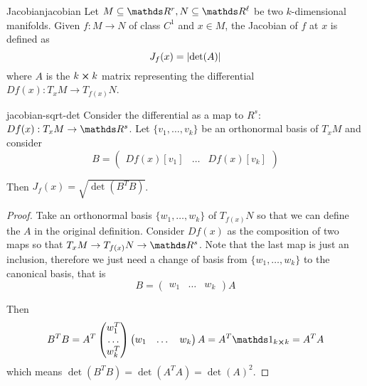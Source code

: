 \documentclass[12pt]{extarticle}
\begin{document}
\begin{definition}{Jacobian}{jacobian}
	Let $M \subseteq \R^r, N \subseteq \R^\ell$ be two $k$-dimensional manifolds.
	Given $f: M \to N$ of class $C^1$ and $x \in M$, the Jacobian of $f$ at $x$ is defined as
	\begin{equation}
		J_f(x) = \abs{\det(A)}
	\end{equation}
	where $A$ is the $k\cross k$ matrix representing the differential $Df(x): T_x M \to T_{f(x)} N$.
\end{definition}

\begin{proposition}{}{jacobian-sqrt-det}
	Consider the differential as a map to $R^s$: $Df(x): T_x M \to \R^s$.
	Let $\{v_1, \dots, v_k\}$ be an orthonormal basis of $T_x M$ and consider
	\begin{equation}
		B = \begin{pmatrix}
			Df(x) [v_1] & \dots & Df(x) [v_k]
		\end{pmatrix}
	\end{equation}

	Then $J_f(x) = \sqrt{\det(B^T B)}$.
\end{proposition}

\begin{proof}
	Take an orthonormal basis $\{w_1, \dots, w_k \}$ of $T_{f(x)} N$ so that we can define the $A$ in
	the original definition.
	Consider $Df(x)$ as the composition of two maps so that $T_x M \to T_{f(x)} N \to \R^s$.
	Note that the last map is just an inclusion, therefore we just need a change of basis from
	$\{w_1, \dots, w_k\}$ to the canonical basis, that is
	\begin{equation}
		B =
		\begin{pmatrix}
			w_1 & \dots & w_k
		\end{pmatrix} A
	\end{equation}

	Then
	\begin{equation}
		B^T B = A^T \begin{pmatrix} w_1^T \\ \dots \\ w_k^T \end{pmatrix}
		\begin{pmatrix} w_1 & \dots & w_k \end{pmatrix} A
		= A^T \mathds 1_{k \cross k} = A^T A
	\end{equation}
	which means $\det(B^T B) = \det(A^T A) = \det(A)^2$.
\end{proof}
\end{document}
